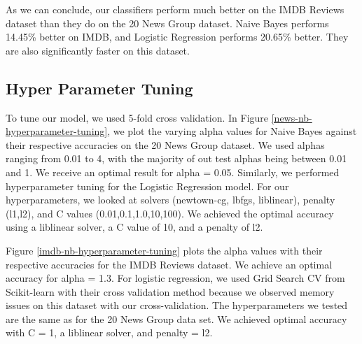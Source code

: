 \documentclass{homework}
\begin{document}
As we can conclude, our classifiers perform much better on the IMDB Reviews dataset than they do on the 20 News Group dataset. Naive Bayes performs 14.45\% better on IMDB, and Logistic Regression performs 20.65\% better. They are also significantly faster on this dataset. 

\subsection{Hyper Parameter Tuning}
To tune our model, we used 5-fold cross validation. In Figure \ref{news-nb-hyperparameter-tuning}, we plot the varying alpha values for Naive Bayes against their respective accuracies on the 20 News Group dataset. We used alphas ranging from 0.01 to 4, with the majority of out test alphas being between 0.01 and 1. We receive an optimal result for alpha = 0.05. Similarly, we performed hyperparameter tuning for the Logistic Regression model. For our hyperparameters, we looked at solvers (newtown-cg, lbfgs, liblinear), penalty (l1,l2), and C values (0.01,0.1,1.0,10,100). We achieved the optimal accuracy using a liblinear solver, a C value of 10, and a penalty of l2. 

Figure \ref{imdb-nb-hyperparameter-tuning} plots the alpha values with their respective accuracies for the IMDB Reviews dataset. We achieve an optimal accuracy for alpha = 1.3. For logistic regression, we used Grid Search CV from Scikit-learn with their cross validation method because we observed memory issues on this dataset with our cross-validation. The hyperparameters we tested are the same as for the 20 News Group data set. We achieved optimal accuracy with C = 1, a liblinear solver, and penalty = l2.
\end{document}
